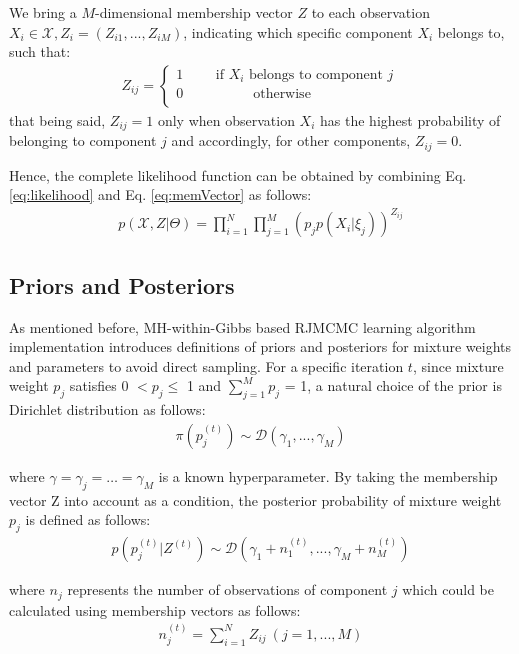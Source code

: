 \documentclass[conference]{IEEEtran}
\begin{document}
We bring a $M$-dimensional membership vector $Z$ to each observation $X_i\in\mathcal{X}, Z_i = (Z_{i1},...,Z_{iM})$, indicating which specific component $X_i$ belongs to\cite{Bouguila2006}, such that:
\begin{align}
Z_{ij} = \left\{\begin{matrix}
1\qquad\mbox{ if }X_i\mbox{  belongs to component }j \\
0\qquad\quad\qquad \mbox{otherwise} \qquad\qquad\quad\quad \\
\end{matrix}\right.
\label{eq:memVector}
\end{align}
that being said, $Z_{ij} = 1$ only when observation $X_i$ has the highest probability of belonging to component $j$ and accordingly, for other components, $Z_{ij} = 0$. 

Hence, the complete likelihood function can be obtained by combining Eq. \eqref{eq:likelihood} and Eq. \eqref{eq:memVector} as follows:
\begin{align}
p(\mathcal{X}, Z|\Theta) = \prod_{i=1}^{N}\prod_{j=1}^{M}(p_jp(X_i|\xi_j))^{Z_{ij}}
\label{eq:compPdf}
\end{align}


\subsection{Priors and Posteriors}
As mentioned before, MH-within-Gibbs based RJMCMC learning algorithm implementation introduces definitions of priors and posteriors for mixture weights and parameters to avoid direct sampling. For a specific iteration $t$, since mixture weight $p_j$ satisfies 0 $< p_j \leq$ 1 and $\sum_{j=1}^Mp_j$ = 1, a natural choice of the prior is Dirichlet distribution\cite{Elguebaly2013} as follows:
\begin{align}
\pi(p_j^{(t)}) \sim \mathcal{D}(\gamma_1,...,\gamma_M )
\label{eq:priorWeight}
\end{align}

where $\gamma = \gamma_j = \dots = \gamma_M$ is a known hyperparameter. By taking the membership vector Z into account as a condition, the posterior probability of mixture weight $p_j$ is defined as follows:
\begin{align}
p(p_j^{(t)}|Z^{(t)}) \sim \mathcal{D}(\gamma_1 + n_1^{(t)},...,\gamma_M + n_M^{(t)})
\label{eq:posterWeight}
\end{align}

where $n_j$ represents the number of observations of component $j$ which could be calculated using membership vectors as follows:
\begin{align}
n_j^{(t)} = \sum_{i=1}^NZ_{ij}\ (j = 1,...,M) 
\label{eq:nj}
\end{align}
\end{document}
